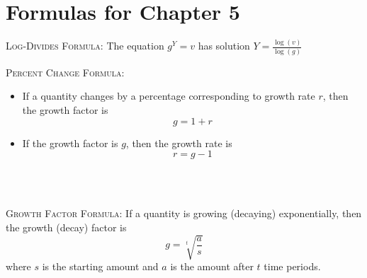 
\section*{Formulas for Chapter 5}  

 \bigskip
 \bigskip
\noindent \hrulefill
 \bigskip
 \bigskip
 
\noindent  \textsc{Log-Divides Formula:} \quad
The equation $g^Y = v$ has solution $\displaystyle Y = \frac{\log (v)}{\log(g)}$

 \bigskip
 \bigskip
\noindent \hrulefill
 \bigskip
 \bigskip
 
\noindent \textsc{Percent Change Formula:} 
\begin{itemize}
\item   If a quantity changes by a percentage corresponding to growth rate $r$, then the growth factor is $$\displaystyle g=1+r$$
\item If the growth factor is $g$, then the growth rate is $$r = g-1$$ ~
\end{itemize}

~\vspace{-.5in} %

\noindent \hrulefill
 \bigskip
 \bigskip
 
\noindent \textsc{Growth Factor Formula:}
If a quantity is growing (decaying) exponentially, then the growth (decay) factor is 
$$\displaystyle g = \sqrt[t]{\frac{a}{s}}$$ where $s$ is the starting amount and $a$ is the amount after $t$ time periods. 

 \bigskip
 \bigskip
\noindent \hrulefill
 \bigskip
 \bigskip
 
\vfill



